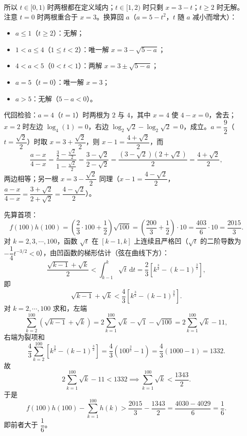 \begin{answer}
所以 $t\in[0,1)$ 时两根都在定义域内；$t\in[1,2)$ 时只剩 $x=3-t$；$t\geqslant2$ 时无解。注意 $t=0$ 时两根重合于 $x=3$。换算回 $a$（$a=5-t^2$，$t$ 随 $a$ 减小而增大）：

\begin{itemize}
\item $a\leqslant1$（$t\geqslant2$）：无解；
\item $1<a\leqslant4$（$1\leqslant t<2$）：唯一解 $x=3-\sqrt{5-a}$；
\item $4<a<5$（$0<t<1$）：两解 $x=3\pm\sqrt{5-a}$；
\item $a=5$（$t=0$）：唯一解 $x=3$；
\item $a>5$：无解（$5-a<0$）。
\end{itemize}

代回检验：$a=4$（$t=1$）时两根为 $2$ 与 $4$，其中 $x=4$ 使 $4-x=0$，舍去；$x=2$ 时左边 $\log_4(1)=0$，右边 $\log_2\sqrt2-\log_2\sqrt2=0$，成立。$a=\dfrac92$（$t=\dfrac{\sqrt2}{2}$）时取 $x=3+\dfrac{\sqrt2}{2}$，则 $x-1=\dfrac{4+\sqrt2}{2}$，而
\nopagebreak[4]
\[\frac{a-x}{4-x}=\frac{\frac32-\frac{\sqrt2}{2}}{1-\frac{\sqrt2}{2}}=\frac{3-\sqrt2}{2-\sqrt2}=\frac{(3-\sqrt2)(2+\sqrt2)}{2}=\frac{4+\sqrt2}{2},\]
两边相等；另一根 $x=3-\dfrac{\sqrt2}{2}$ 同理（$x-1=\dfrac{4-\sqrt2}{2}$，$\dfrac{a-x}{4-x}=\dfrac{3+\sqrt2}{2+\sqrt2}=\dfrac{4-\sqrt2}{2}$）。

先算首项：
\nopagebreak[4]
\[f(100)h(100)=\left(\frac23\cdot100+\frac12\right)\sqrt{100}=\left(\frac{200}{3}+\frac12\right)\cdot10=\frac{403}{6}\cdot10=\frac{2015}{3}.\]
对 $k=2,3,\cdots,100$，函数 $\sqrt t$ 在 $[k-1,k]$ 上连续且严格凹（$\sqrt t$ 的二阶导数为 $-\dfrac{1}{4}t^{-3/2}<0$），由凹函数的梯形估计（弦在曲线下方）：
\nopagebreak[4]
\[\frac{\sqrt{k-1}+\sqrt{k}}{2}<\int_{k-1}^{k}\sqrt t\,\mathrm dt=\frac23\left[k^{\frac32}-(k-1)^{\frac32}\right],\]
即
\nopagebreak[4]
\[\sqrt{k-1}+\sqrt{k}<\frac43\left[k^{\frac32}-(k-1)^{\frac32}\right].\]
对 $k=2,\cdots,100$ 求和，左端
\nopagebreak[4]
\[\sum_{k=2}^{100}\left(\sqrt{k-1}+\sqrt{k}\right)=2\sum_{k=1}^{100}\sqrt k-\sqrt1-\sqrt{100}=2\sum_{k=1}^{100}\sqrt k-11,\]
右端为裂项和
\nopagebreak[4]
\[\frac43\sum_{k=2}^{100}\left[k^{\frac32}-(k-1)^{\frac32}\right]=\frac43\left(100^{\frac32}-1\right)=\frac43(1000-1)=1332.\]
故
\nopagebreak[4]
\[2\sum_{k=1}^{100}\sqrt k-11<1332\implies\sum_{k=1}^{100}\sqrt k<\frac{1343}{2}.\]
于是
\nopagebreak[4]
\[f(100)h(100)-\sum_{k=1}^{100}h(k)>\frac{2015}{3}-\frac{1343}{2}=\frac{4030-4029}{6}=\frac16.\]
即前者大于 $\dfrac16$。


\end{answer}
